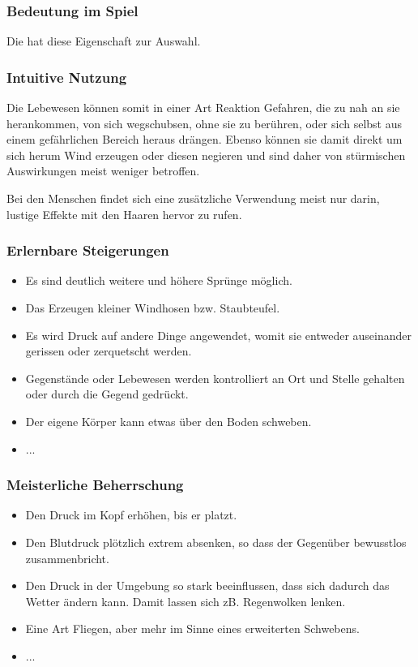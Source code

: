 \subsubsection{Bedeutung im Spiel}
Die  hat diese Eigenschaft zur Auswahl. 

\subsubsection{Intuitive Nutzung}
Die Lebewesen können somit in einer Art Reaktion Gefahren, die zu nah an sie herankommen, von sich wegschubsen, ohne sie zu berühren, oder sich selbst aus einem gefährlichen Bereich heraus drängen. Ebenso können sie damit direkt um sich herum Wind erzeugen oder diesen negieren und sind daher von stürmischen Auswirkungen meist weniger betroffen.

Bei den Menschen findet sich eine zusätzliche Verwendung meist nur darin, lustige Effekte mit den Haaren hervor zu rufen.

\subsubsection{Erlernbare Steigerungen}
\begin{itemize}
	\item Es sind deutlich weitere und höhere Sprünge möglich.
	\item Das Erzeugen kleiner Windhosen bzw. Staubteufel.
	\item Es wird Druck auf andere Dinge angewendet, womit sie entweder auseinander gerissen oder zerquetscht werden.
	\item Gegenstände oder Lebewesen werden kontrolliert an Ort und Stelle gehalten oder durch die Gegend gedrückt.
	\item Der eigene Körper kann etwas über den Boden schweben.
	\item ...
\end{itemize}

\subsubsection{Meisterliche Beherrschung} 
\begin{itemize}
	\item Den Druck im Kopf erhöhen, bis er platzt.
	\item Den Blutdruck plötzlich extrem absenken, so dass der Gegenüber bewusstlos zusammenbricht. 
	\item Den Druck in der Umgebung so stark beeinflussen, dass sich dadurch das Wetter ändern kann. Damit lassen sich zB. Regenwolken lenken. 
	\item Eine Art Fliegen, aber mehr im Sinne eines erweiterten Schwebens.
	\item ...
\end{itemize}



